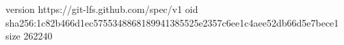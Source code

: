 version https://git-lfs.github.com/spec/v1
oid sha256:1c82b466d1ec5755348868189941385525e2357c6ee1c4aee52db66d5e7bece1
size 262240

